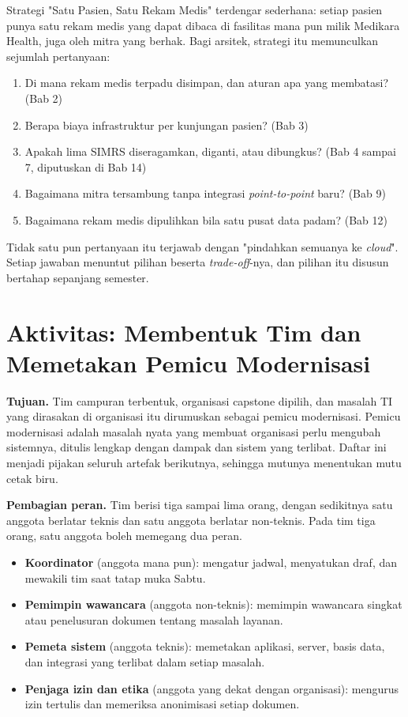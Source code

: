 \begin{kasus}[title={Kasus Medikara Health: Pertanyaan dari "Satu Pasien, Satu Rekam Medis"}]
  Strategi "Satu Pasien, Satu Rekam Medis" terdengar sederhana: setiap pasien punya satu
  rekam medis yang dapat dibaca di fasilitas mana pun milik Medikara Health, juga oleh
  mitra yang berhak. Bagi arsitek, strategi itu memunculkan sejumlah pertanyaan:
  \begin{enumerate}
    \item Di mana rekam medis terpadu disimpan, dan aturan apa yang membatasi? (Bab 2)
    \item Berapa biaya infrastruktur per kunjungan pasien? (Bab 3)
    \item Apakah lima SIMRS diseragamkan, diganti, atau dibungkus? (Bab 4 sampai 7, diputuskan di Bab 14)
    \item Bagaimana mitra tersambung tanpa integrasi \textit{point-to-point} baru? (Bab 9)
    \item Bagaimana rekam medis dipulihkan bila satu pusat data padam? (Bab 12)
  \end{enumerate}
  Tidak satu pun pertanyaan itu terjawab dengan "pindahkan semuanya ke \textit{cloud}".
  Setiap jawaban menuntut pilihan beserta \textit{trade-off}-nya, dan pilihan itu
  disusun bertahap sepanjang semester.
\end{kasus}

\section{Aktivitas: Membentuk Tim dan Memetakan Pemicu Modernisasi}

\textbf{Tujuan.} Tim campuran terbentuk, organisasi capstone dipilih, dan masalah TI
yang dirasakan di organisasi itu dirumuskan sebagai pemicu modernisasi. Pemicu
modernisasi adalah masalah nyata yang membuat organisasi perlu mengubah sistemnya,
ditulis lengkap dengan dampak dan sistem yang terlibat. Daftar ini menjadi pijakan
seluruh artefak berikutnya, sehingga mutunya menentukan mutu cetak biru.

\textbf{Pembagian peran.} Tim berisi tiga sampai lima orang, dengan sedikitnya satu
anggota berlatar teknis dan satu anggota berlatar non-teknis. Pada tim tiga orang, satu
anggota boleh memegang dua peran.
\begin{itemize}
  \item \textbf{Koordinator} (anggota mana pun): mengatur jadwal, menyatukan draf, dan
        mewakili tim saat tatap muka Sabtu.
  \item \textbf{Pemimpin wawancara} (anggota non-teknis): memimpin wawancara singkat
        atau penelusuran dokumen tentang masalah layanan.
  \item \textbf{Pemeta sistem} (anggota teknis): memetakan aplikasi, server, basis data,
        dan integrasi yang terlibat dalam setiap masalah.
  \item \textbf{Penjaga izin dan etika} (anggota yang dekat dengan organisasi): mengurus
        izin tertulis dan memeriksa anonimisasi setiap dokumen.
\end{itemize}


